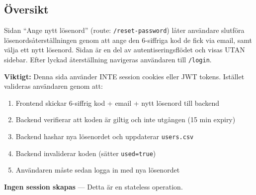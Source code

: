 \documentclass[12pt,a4paper]{article}
\begin{document}
\subsection{Översikt}
Sidan ``Ange nytt lösenord'' (route: \texttt{/reset-password}) låter användare slutföra 
lösenordsåterställningen genom att ange den 6-siffriga kod de fick via email, 
samt välja ett nytt lösenord. Sidan är en del av autentiseringsflödet och visas UTAN sidebar.
Efter lyckad återställning navigeras användaren till \texttt{/login}.

\textbf{Viktigt:} Denna sida använder INTE session cookies eller JWT tokens. 
Istället valideras användaren genom att:
\begin{enumerate}[noitemsep]
  \item Frontend skickar 6-siffrig kod + email + nytt lösenord till backend
  \item Backend verifierar att koden är giltig och inte utgången (15 min expiry)
  \item Backend hashar nya lösenordet och uppdaterar \texttt{users.csv}
  \item Backend invaliderar koden (sätter \texttt{used=true})
  \item Användaren måste sedan logga in med nya lösenordet
\end{enumerate}

\textbf{Ingen session skapas} — Detta är en stateless operation.
\end{document}
